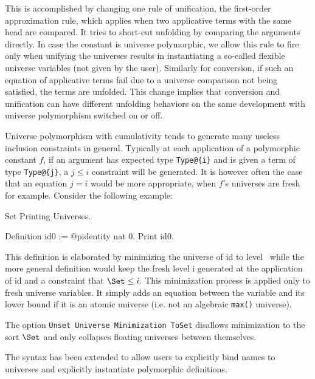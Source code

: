 This is accomplished by changing one rule of unification, the
first-order approximation rule, which applies when two applicative terms
with the same head are compared. It tries to short-cut unfolding by
comparing the arguments directly. In case the constant is universe
polymorphic, we allow this rule to fire only when unifying the universes
results in instantiating a so-called flexible universe variables (not
given by the user). Similarly for conversion, if such an equation of
applicative terms fail due to a universe comparison not being satisfied,
the terms are unfolded. This change implies that conversion and
unification can have different unfolding behaviors on the same
development with universe polymorphism switched on or off.


Universe polymorphism with cumulativity tends to generate many useless
inclusion constraints in general. Typically at each application of a
polymorphic constant $f$, if an argument has expected type
\verb|Type@{i}| and is given a term of type \verb|Type@{j}|, a $j \le i$
constraint will be generated. It is however often the case that an
equation $j = i$ would be more appropriate, when $f$'s
universes are fresh for example. Consider the following example:

\begin{coq_eval}
Set Printing Universes.
\end{coq_eval}
\begin{coq_example}
Definition id0 := @pidentity nat 0.
Print id0.
\end{coq_example}

This definition is elaborated by minimizing the universe of id to level
\Set~while the more general definition would keep the fresh level i
generated at the application of id and a constraint that $\Set \le i$.
This minimization process is applied only to fresh universe
variables. It simply adds an equation between the variable and its lower
bound if it is an atomic universe (i.e. not an algebraic \texttt{max()}
universe).

The option \texttt{Unset Universe Minimization ToSet} disallows
minimization to the sort $\Set$ and only collapses floating universes
between themselves.


The syntax has been extended to allow users to explicitly bind names to
universes and explicitly instantiate polymorphic definitions.

